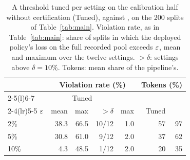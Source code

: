 \begin{table}[!t]
\centering
\small
\setlength{\tabcolsep}{4pt}
\begin{tabular}{@{}lrrrrrr@{}}
\toprule
 & \multicolumn{4}{c}{Violation rate (\%)} & \multicolumn{2}{c}{Tokens (\%)} \\
\cmidrule(lr){2-5}\cmidrule(l){6-7}
 & \multicolumn{3}{c}{Tuned} & \climb{} & & \\
\cmidrule(lr){2-4}\cmidrule(lr){5-5}
$\varepsilon$ & mean & max & $>\delta$ & max & Tuned & \climb{} \\
\midrule
2\% & 38.3 & 66.5 & 10/12 & 1.0 & 57 & 97 \\
5\% & 30.8 & 61.0 & 9/12 & 2.0 & 37 & 62 \\
10\% & 4.3 & 48.5 & 1/12 & 2.0 & 20 & 35 \\
\bottomrule
\end{tabular}
\caption{A threshold tuned per setting on the calibration half without certification (Tuned), against \climb{}, on the 200 splits of Table~\ref{tab:main}. Violation rate, as in Table~\ref{tab:main}: share of splits in which the deployed policy's loss on the full recorded pool exceeds $\varepsilon$, mean and maximum over the twelve settings. $>\delta$: settings above $\delta = 10\%$. Tokens: mean share of the pipeline's.}
\label{tab:plugin}
\end{table}
